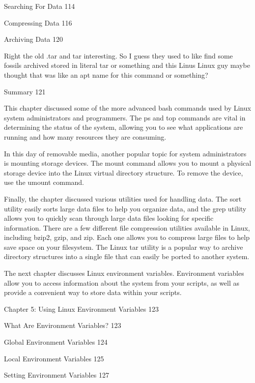 Searching For Data 114



Compressing Data 116



Archiving Data 120

Right the old .tar and tar interesting. So I guess they used to like find some fossils archived stored in literal tar or something and this Linus Linux guy maybe thought that was like an apt name for this command or something?

Summary 121

This chapter discussed some of the more advanced bash commands used by Linux system administrators and programmers. The ps and top commands are vital in determining the status of the system, allowing you to see what applications are running and how many resources they are consuming.

In this day of removable media, another popular topic for system administrators is mounting storage devices. The mount command allows you to mount a physical storage device into the Linux virtual directory structure. To remove the device, use the umount command.

Finally, the chapter discussed various utilities used for handling data. The sort utility easily sorts large data files to help you organize data, and the grep utility allows you to quickly scan through large data files looking for specific information. There are a few different file compression utilities available in Linux, including bzip2, gzip, and zip. Each one allows you to compress large files to help save space on your filesystem. The Linux tar utility is a popular way to archive directory structures into a single file that can easily be ported to another system.

The next chapter discusses Linux environment variables. Environment variables allow you to access information about the system from your scripts, as well as provide a convenient way to store data within your scripts.

Chapter 5: Using Linux Environment Variables 123



What Are Environment Variables? 123



Global Environment Variables 124



Local Environment Variables 125



Setting Environment Variables 127



